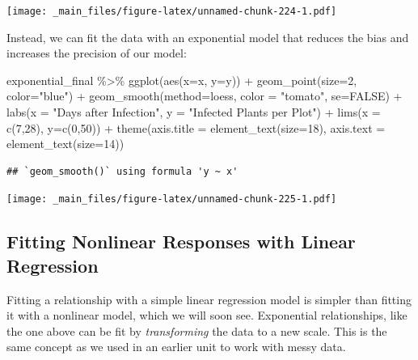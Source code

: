 \documentclass[
]{book}
\newenvironment{Shaded}{\begin{snugshade}}{\end{snugshade}}
\newcommand{\AttributeTok}[1]{\textcolor[rgb]{0.77,0.63,0.00}{#1}}
\newcommand{\ConstantTok}[1]{\textcolor[rgb]{0.00,0.00,0.00}{#1}}
\newcommand{\DecValTok}[1]{\textcolor[rgb]{0.00,0.00,0.81}{#1}}
\newcommand{\FunctionTok}[1]{\textcolor[rgb]{0.00,0.00,0.00}{#1}}
\newcommand{\NormalTok}[1]{#1}
\newcommand{\SpecialCharTok}[1]{\textcolor[rgb]{0.00,0.00,0.00}{#1}}
\newcommand{\StringTok}[1]{\textcolor[rgb]{0.31,0.60,0.02}{#1}}
\begin{document}
\texttt{[image: \_main\_files/figure-latex/unnamed-chunk-224-1.pdf]}

Instead, we can fit the data with an exponential model that reduces the bias and increases the precision of our model:

\begin{Shaded}
\begin{Highlighting}[]
\NormalTok{exponential\_final }\SpecialCharTok{\%\textgreater{}\%}
  \FunctionTok{ggplot}\NormalTok{(}\FunctionTok{aes}\NormalTok{(}\AttributeTok{x=}\NormalTok{x, }\AttributeTok{y=}\NormalTok{y)) }\SpecialCharTok{+}
  \FunctionTok{geom\_point}\NormalTok{(}\AttributeTok{size=}\DecValTok{2}\NormalTok{, }\AttributeTok{color=}\StringTok{"blue"}\NormalTok{) }\SpecialCharTok{+}
  \FunctionTok{geom\_smooth}\NormalTok{(}\AttributeTok{method=}\StringTok{\textquotesingle{}loess\textquotesingle{}}\NormalTok{, }\AttributeTok{color =} \StringTok{"tomato"}\NormalTok{, }\AttributeTok{se=}\ConstantTok{FALSE}\NormalTok{) }\SpecialCharTok{+} 
  \FunctionTok{labs}\NormalTok{(}\AttributeTok{x =} \StringTok{"Days after Infection"}\NormalTok{, }\AttributeTok{y =} \StringTok{"Infected Plants per Plot"}\NormalTok{) }\SpecialCharTok{+}
  \FunctionTok{lims}\NormalTok{(}\AttributeTok{x =} \FunctionTok{c}\NormalTok{(}\DecValTok{7}\NormalTok{,}\DecValTok{28}\NormalTok{), }\AttributeTok{y=}\FunctionTok{c}\NormalTok{(}\DecValTok{0}\NormalTok{,}\DecValTok{50}\NormalTok{)) }\SpecialCharTok{+}
  \FunctionTok{theme}\NormalTok{(}\AttributeTok{axis.title =} \FunctionTok{element\_text}\NormalTok{(}\AttributeTok{size=}\DecValTok{18}\NormalTok{),}
        \AttributeTok{axis.text =} \FunctionTok{element\_text}\NormalTok{(}\AttributeTok{size=}\DecValTok{14}\NormalTok{))}
\end{Highlighting}
\end{Shaded}

\begin{verbatim}
## `geom_smooth()` using formula 'y ~ x'
\end{verbatim}

\texttt{[image: \_main\_files/figure-latex/unnamed-chunk-225-1.pdf]}

\hypertarget{fitting-nonlinear-responses-with-linear-regression}{%
\subsection{Fitting Nonlinear Responses with Linear Regression}\label{fitting-nonlinear-responses-with-linear-regression}}

Fitting a relationship with a simple linear regression model is simpler than fitting it with a nonlinear model, which we will soon see. Exponential relationships, like the one above can be fit by \emph{transforming} the data to a new scale. This is the same concept as we used in an earlier unit to work with messy data.
\end{document}
